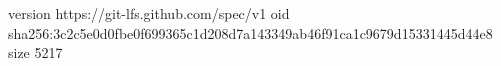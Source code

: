 version https://git-lfs.github.com/spec/v1
oid sha256:3c2c5e0d0fbe0f699365c1d208d7a143349ab46f91ca1c9679d15331445d44e8
size 5217
